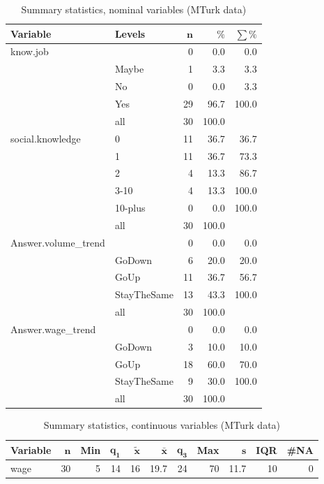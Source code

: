 \documentclass[a4paper,10pt]{article}\usepackage[]{graphicx}\usepackage[]{color}
\begin{document}
\begin{table}[ht]
\centering
{\footnotesize
\begin{tabular}{ll|rrr}
 \textbf{Variable} & \textbf{Levels} & $\mathbf{n}$ & $\mathbf{\%}$ & $\mathbf{\sum \%}$ \\ 
  \hline
know.job &  & 0 & 0.0 & 0.0 \\ 
   & Maybe & 1 & 3.3 & 3.3 \\ 
   & No & 0 & 0.0 & 3.3 \\ 
   & Yes & 29 & 96.7 & 100.0 \\ 
   \hline
 & all & 30 & 100.0 &  \\ 
   \hline
\hline
social.knowledge & 0 & 11 & 36.7 & 36.7 \\ 
   & 1 & 11 & 36.7 & 73.3 \\ 
   & 2 & 4 & 13.3 & 86.7 \\ 
   & 3-10 & 4 & 13.3 & 100.0 \\ 
   & 10-plus & 0 & 0.0 & 100.0 \\ 
   \hline
 & all & 30 & 100.0 &  \\ 
   \hline
\hline
Answer.volume\_trend &  & 0 & 0.0 & 0.0 \\ 
   & GoDown & 6 & 20.0 & 20.0 \\ 
   & GoUp & 11 & 36.7 & 56.7 \\ 
   & StayTheSame & 13 & 43.3 & 100.0 \\ 
   \hline
 & all & 30 & 100.0 &  \\ 
   \hline
\hline
Answer.wage\_trend &  & 0 & 0.0 & 0.0 \\ 
   & GoDown & 3 & 10.0 & 10.0 \\ 
   & GoUp & 18 & 60.0 & 70.0 \\ 
   & StayTheSame & 9 & 30.0 & 100.0 \\ 
   \hline
 & all & 30 & 100.0 &  \\ 
   \hline
\hline
\end{tabular}
}
\caption{Summary statistics, nominal variables (MTurk data)} 
\label{tab1:49-3020}
\end{table}
\begin{table}[ht]
\centering
{\footnotesize
\begin{tabular}{lrrrrrrrrrr}
 \textbf{Variable} & $\mathbf{n}$ & \textbf{Min} & $\mathbf{q_1}$ & $\mathbf{\widetilde{x}}$ & $\mathbf{\bar{x}}$ & $\mathbf{q_3}$ & \textbf{Max} & $\mathbf{s}$ & \textbf{IQR} & \textbf{\#NA} \\ 
  \hline
wage & 30 & 5 & 14 & 16 & 19.7 & 24 & 70 & 11.7 & 10 & 0 \\ 
  \end{tabular}
}
\caption{Summary statistics, continuous variables (MTurk data)} 
\label{tab2:49-3020}
\end{table}
\end{document}
